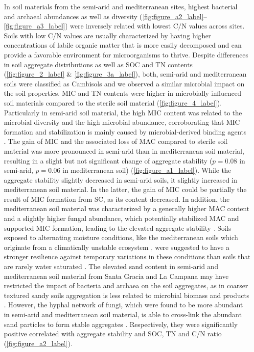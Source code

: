 In soil materials from the semi-arid and mediterranean sites, highest bacterial and archaeal abundances as well as diversity (\cref{fig:figure_a2_label}--\cref{fig:figure_a3_label}) were inversely related with lowest C/N values across sites. 
Soils with low C/N values are usually characterized by having higher concentrations of labile organic matter that is more easily decomposed \citep{Kuramae2012} and can provide a favorable environment for microorganisms to thrive. 
Despite differences in soil aggregate distributions as well as SOC and TN contents (\cref{fig:figure_2_label} \& \cref{fig:figure_3a_label}), both, semi-arid and mediterranean soils were classified as Cambisols \citep{Bernhard2018b} and we observed a similar microbial impact on the soil properties. 
MIC and TN contents were higher in microbially influenced soil materials compared to the sterile soil material (\cref{fig:figure_4_label}). 
Particularly in semi-arid soil material, the high MIC content was related to the microbial diversity and the high microbial abundance, corroborating that MIC formation and stabilization is mainly caused by microbial-derived binding agents \citep{Six2004}. 
The gain of MIC and the associated loss of MAC compared to sterile soil material was more pronounced in semi-arid than in mediterranean soil material, resulting in a slight but not significant change of aggregate stability (\(p = 0.08\) in semi-arid, \(p = 0.06\) in mediterranean soil) (\cref{fig:figure_a1_label}). 
While the aggregate stability slightly decreased in semi-arid soils, it slightly increased in mediterranean soil material. 
In the latter, the gain of MIC could be partially the result of MIC formation from SC, as its content decreased. 
In addition, the mediterranean soil material was characterized by a generally higher MAC content and a slightly higher fungal abundance, which potentially stabilized MAC and supported MIC formation, leading to the elevated aggregate stability \citep{Chotte2005}. 
Soils exposed to alternating moisture conditions, like the mediterranean soils which originate from a climatically unstable ecosystem \citep{Rodriguez2022}, were suggested to have a stronger resilience against temporary variations in these conditions than soils that are rarely water saturated \citep{Totsche2018}. 
The elevated sand content in semi-arid and mediterranean soil material from Santa Gracia and La Campana \citep{Bernhard2018b} may have restricted the impact of bacteria and archaea on the soil aggregates, as in coarser textured sandy soils aggregation is less related to microbial biomass and products \citep{Degens1996}. 
However, the hyphal network of fungi, which were found to be more abundant in semi-arid and mediterranean soil material, is able to cross-link the abundant sand particles to form stable aggregates \citep{Six2004}. 
Respectively, they were significantly positive correlated with aggregate stability and SOC, TN and C/N ratio (\cref{fig:figure_a2_label}).


